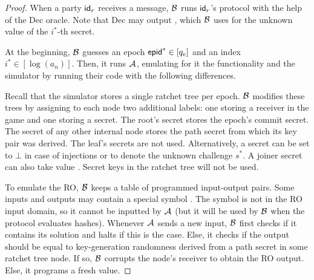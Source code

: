 \begin{proof}
When a party ${\mathsf{id}}_r$ receives a message, $\mathcal{B}_{\relax}$ runs ${\mathsf{id}}_r$'s protocol with the help of the Dec oracle. Note that Dec may output , which $\mathcal{B}_{\relax}$ uses for the unknown value of the $i^*$-th secret.

At the beginning, $\mathcal{B}_{\relax}$ guesses an epoch ${\normalfont\textsf{epid}}^*\in[q_e]$ and an index $i^* \in [\log(a_n)]$. Then, it runs $\mathcal{A}_{\relax}$, emulating for it the functionality and the simulator by running their code with the following differences.

Recall that the simulator stores a single ratchet tree per epoch. $\mathcal{B}_{\relax}$ modifies these trees by assigning to each node two additional labels: one storing a receiver in the \mmowrcca game and one storing a secret. The root's secret stores the epoch's commit secret. The secret of any other internal node stores the path secret from which its key pair was derived. The leaf's secrets are not used. Alternatively, a secret can be set to $\bot$ in case of injections or  to denote the unknown \mmowrcca challenge $s^*$. A joiner secret can also take value . Secret keys in the ratchet tree will not be used.

To emulate the RO, $\mathcal{B}_{\relax}$ keeps a table of programmed input-output pairs. Some inputs and outputs may contain a special symbol . The symbol is not in the RO input domain, so it cannot be inputted by $\mathcal{A}_{\relax}$ (but it will be used by $\mathcal{B}_{\relax}$ when the protocol evaluates hashes). Whenever $\mathcal{A}_{\relax}$ sends a new input, $\mathcal{B}_{\relax}$ first checks if it contains its solution and halts if this is the case. Else, it checks if the output should be equal to key-generation randomness derived from a path secret in some ratchet tree node. If so, $\mathcal{B}_{\relax}$ corrupts the node's receiver to obtain the RO output. Else, it programs a fresh value.


\end{proof}
